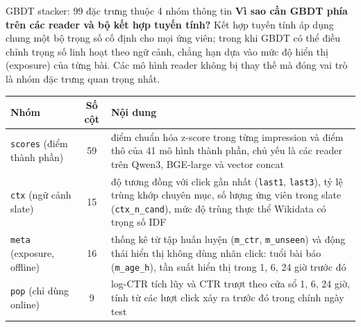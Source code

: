 \documentclass[aspectratio=169,t]{beamer}
\newcommand{\code}[1]{\texttt{#1}}
\begin{document}
\begin{frame}[shrink]{GBDT stacker: 99 đặc trưng thuộc 4 nhóm thông tin}
\footnotesize
\textbf{Vì sao cần GBDT phía trên các reader và bộ kết hợp tuyến tính?} Kết hợp tuyến tính áp dụng chung một bộ trọng số cố định cho mọi ứng viên; trong khi GBDT có thể điều chỉnh trọng số linh hoạt theo ngữ cảnh,
chẳng hạn dựa vào mức độ hiển thị (exposure) của từng bài. Các mô hình reader không bị thay thế mà đóng vai trò là nhóm đặc trưng quan trọng nhất.\par\vspace{3pt}
\scriptsize
\renewcommand{\arraystretch}{1.18}
\begin{tabularx}{\textwidth}{@{}P{3.3cm}cY@{}}
\toprule
\textbf{Nhóm} & \textbf{Số cột} & \textbf{Nội dung}\\
\midrule
\code{scores} (điểm thành phần) & 59 & điểm chuẩn hóa z-score trong từng impression và điểm thô của 41 mô hình thành phần, chủ yếu là các reader trên Qwen3, BGE-large và vector concat\\
\code{ctx} (ngữ cảnh slate) & 15 & độ tương đồng với click gần nhất (\code{last1}, \code{last3}), tỷ lệ trùng khớp chuyên mục, số lượng ứng viên trong slate (\code{ctx\_n\_cand}), mức độ trùng thực thể Wikidata có trọng số IDF\\
\code{meta} (exposure, offline) & 16 & thống kê từ tập huấn luyện (\code{m\_ctr}, \code{m\_unseen}) và động thái hiển thị không dùng nhãn click: tuổi bài báo (\code{m\_age\_h}), tần suất hiển thị trong 1, 6, 24 giờ trước đó\\
\code{pop} (chỉ dùng online) & 9 & log-CTR tích lũy và CTR trượt theo cửa sổ 1, 6, 24 giờ, tính từ các lượt click xảy ra trước đó trong chính ngày test\\
\bottomrule
\end{tabularx}
\par\kern0pt%
\end{frame}
\end{document}

